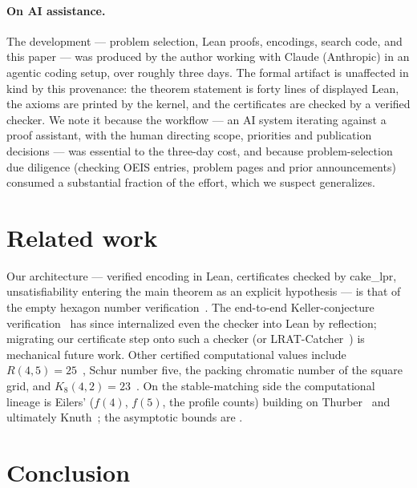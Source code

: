\documentclass[11pt]{article}
\begin{document}
\paragraph{On AI assistance.} The development --- problem selection, Lean proofs,
encodings, search code, and this paper --- was produced by the author working with
Claude (Anthropic) in an agentic coding setup, over roughly three days. The formal
artifact is unaffected in kind by this provenance: the theorem statement is forty lines of
displayed Lean, the axioms are printed by the kernel, and the certificates are checked by
a verified checker. We note it because the workflow --- an AI system iterating against a
proof assistant, with the human directing scope, priorities and publication decisions ---
was essential to the three-day cost, and because problem-selection due diligence (checking
OEIS entries, problem pages and prior announcements) consumed a substantial fraction of
the effort, which we suspect generalizes.

\section{Related work}

Our architecture --- verified encoding in Lean, certificates checked by \textsf{cake\_lpr},
unsatisfiability entering the main theorem as an explicit hypothesis --- is that of the empty
hexagon number verification~\cite{hexagon}. The end-to-end Keller-conjecture
verification~\cite{keller} has since internalized even the checker into Lean by reflection;
migrating our certificate step onto such a checker (or LRAT-Catcher~\cite{lratcatcher}) is
mechanical future work. Other certified computational values include $R(4,5)=25$~\cite{r45},
Schur number five, the packing chromatic number of the square grid, and
$K_8(4,2)=23$~\cite{k8}. On the stable-matching side the computational lineage is Eilers'
($f(4)$, $f(5)$, the profile counts) building on Thurber~\cite{thurber} and ultimately
Knuth~\cite{knuth}; the asymptotic bounds are \cite{kow,pp}.

\section{Conclusion}
\end{document}
